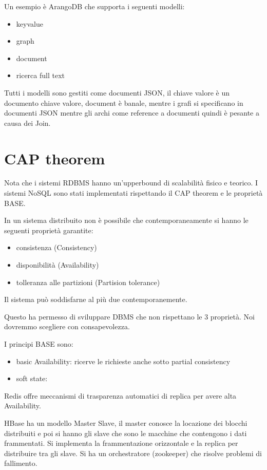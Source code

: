 Un esempio è ArangoDB che supporta i seguenti modelli:
\begin{itemize}
      \item keyvalue
      \item graph
      \item document
      \item ricerca full text
\end{itemize}
Tutti i modelli sono gestiti come documenti JSON, il chiave valore è un documento 
chiave valore, document è banale, mentre i grafi si specificano in documenti JSON
mentre gli archi come reference a documenti quindi è pesante a causa dei Join.

\section{CAP theorem}
Nota che i sistemi RDBMS hanno un'upperbound di scalabilità fisico e teorico. I 
sistemi NoSQL sono stati implementati rispettando il CAP theorem e le proprietà
BASE.

\begin{teorema} 
      In un sistema distribuito non è possibile che contemporaneamente si hanno 
      le seguenti proprietà garantite:
      \begin{itemize}
            \item consistenza (Consistency)
            \item disponibilità (Availability)
            \item tolleranza alle partizioni (Partision tolerance)
      \end{itemize}      
      Il sistema può soddisfarne al più due contemporanemente.
\end{teorema}

Questo ha permesso di sviluppare DBMS che non rispettano le 3 proprietà.  Noi 
dovremmo scegliere con consapevolezza.

I principi BASE sono:
\begin{itemize}
      \item basic Availability: ricerve le richieste anche sotto partial consistency
      \item soft state:
\end{itemize}


Redis offre meccanismi di trasparenza automatici di replica per avere alta Availability.

HBase ha un modello Master Slave, il master conosce la locazione dei blocchi distribuiti
e poi si hanno gli slave che sono le macchine che contengono i dati frammentati.
Si implementa la frammentazione orizzontale e la replica per distribuire tra gli
slave. Si ha un orchestratore (zookeeper) che risolve problemi di fallimento.

